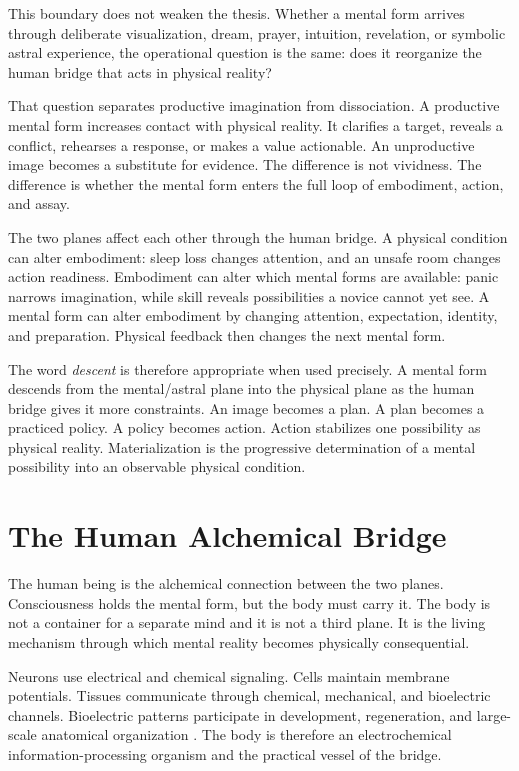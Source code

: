 \documentclass[11pt]{article}
\theoremstyle{plain}
\theoremstyle{definition}
\begin{document}
This boundary does not weaken the thesis. Whether a mental form arrives through
deliberate visualization, dream, prayer, intuition, revelation, or symbolic astral
experience, the operational question is the same: does it reorganize the human bridge
that acts in physical reality?

That question separates productive imagination from dissociation. A productive mental
form increases contact with physical reality. It clarifies a target, reveals a
conflict, rehearses a response, or makes a value actionable. An unproductive image
becomes a substitute for evidence. The difference is not vividness. The difference is
whether the mental form enters the full loop of embodiment, action, and assay.

The two planes affect each other through the human bridge. A physical condition can
alter embodiment: sleep loss changes attention, and an unsafe room changes action
readiness. Embodiment can alter which mental forms are available: panic narrows
imagination, while skill reveals possibilities a novice cannot yet see. A mental form
can alter embodiment by changing attention, expectation, identity, and preparation.
Physical feedback then changes the next mental form.

The word \emph{descent} is therefore appropriate when used precisely. A mental form
descends from the mental/astral plane into the physical plane as the human bridge gives
it more constraints. An image becomes a plan. A plan becomes a practiced policy. A
policy becomes action. Action stabilizes one possibility as physical reality.
Materialization is the progressive determination of a mental possibility into an
observable physical condition.

\section{The Human Alchemical Bridge}

The human being is the alchemical connection between the two planes. Consciousness
holds the mental form, but the body must carry it. The body is not a container for a
separate mind and it is not a third plane. It is the living mechanism through which
mental reality becomes physically consequential.

Neurons use electrical and chemical signaling. Cells maintain membrane potentials.
Tissues communicate through chemical, mechanical, and bioelectric channels.
Bioelectric patterns participate in development, regeneration, and large-scale
anatomical organization \citep{levin2021bioelectric,durant2019planarian}. The body is
therefore an electrochemical information-processing organism and the practical vessel
of the bridge.
\end{document}
